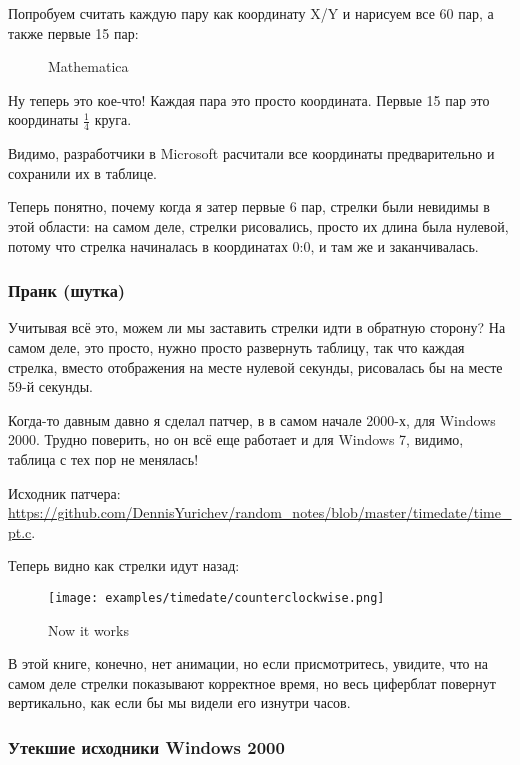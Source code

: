 Попробуем считать каждую пару как координату X/Y и нарисуем все 60 пар, а также первые 15 пар:

\begin{figure}[H]
\centering
{}
\caption{Mathematica}
\end{figure}

Ну теперь это кое-что!
Каждая пара это просто координата.
Первые 15 пар это координаты $\frac{1}{4}$ круга.

Видимо, разработчики в Microsoft расчитали все координаты предварительно и сохранили их в таблице.

Теперь понятно, почему когда я затер первые 6 пар, стрелки были невидимы в этой области: на самом деле, стрелки рисовались,
просто их длина была нулевой, потому что стрелка начиналась в координатах 0:0, и там же и заканчивалась.

\subsubsection{Пранк (шутка)}

Учитывая всё это, можем ли мы заставить стрелки идти в обратную сторону?
На самом деле, это просто, нужно просто развернуть таблицу, так что каждая стрелка,
вместо отображения на месте нулевой секунды, рисовалась бы на месте 59-й секунды.

Когда-то давным давно я сделал патчер, в в самом начале 2000-х, для Windows 2000.
Трудно поверить, но он всё еще работает и для Windows 7, видимо, таблица с тех пор не менялась!

Исходник патчера: \url{https://github.com/DennisYurichev/random_notes/blob/master/timedate/time_pt.c}.

Теперь видно как стрелки идут назад:

\begin{figure}[H]
\centering
\texttt{[image: examples/timedate/counterclockwise.png]}
\caption{Now it works}
\end{figure}

В этой книге, конечно, нет анимации, но если присмотритесь, увидите, что на самом деле стрелки показывают корректное время,
но весь циферблат повернут вертикально, как если бы мы видели его изнутри часов.

\subsubsection{Утекшие исходники Windows 2000}


